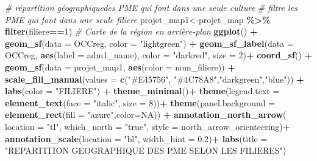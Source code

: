 \documentclass[
]{article}
\newenvironment{Shaded}{\begin{snugshade}}{\end{snugshade}}
\newcommand{\AttributeTok}[1]{\textcolor[rgb]{0.13,0.29,0.53}{#1}}
\newcommand{\CommentTok}[1]{\textcolor[rgb]{0.56,0.35,0.01}{\textit{#1}}}
\newcommand{\ConstantTok}[1]{\textcolor[rgb]{0.56,0.35,0.01}{#1}}
\newcommand{\DecValTok}[1]{\textcolor[rgb]{0.00,0.00,0.81}{#1}}
\newcommand{\FloatTok}[1]{\textcolor[rgb]{0.00,0.00,0.81}{#1}}
\newcommand{\FunctionTok}[1]{\textcolor[rgb]{0.13,0.29,0.53}{\textbf{#1}}}
\newcommand{\NormalTok}[1]{#1}
\newcommand{\OtherTok}[1]{\textcolor[rgb]{0.56,0.35,0.01}{#1}}
\newcommand{\SpecialCharTok}[1]{\textcolor[rgb]{0.81,0.36,0.00}{\textbf{#1}}}
\newcommand{\StringTok}[1]{\textcolor[rgb]{0.31,0.60,0.02}{#1}}
\begin{document}
\begin{Shaded}
\begin{Highlighting}[]
\CommentTok{\# répartition géographiquedes PME qui font dans une seule culture}
\CommentTok{\# filtre les PME qui font dans une seule filiere}
\NormalTok{projet\_map1}\OtherTok{\textless{}{-}}\NormalTok{projet\_map }\SpecialCharTok{\%\textgreater{}\%} \FunctionTok{filter}\NormalTok{(filiere}\SpecialCharTok{==}\DecValTok{1}\NormalTok{) }
 \CommentTok{\# Carte de la région en arrière{-}plan}
\FunctionTok{ggplot}\NormalTok{() }\SpecialCharTok{+}
  \FunctionTok{geom\_sf}\NormalTok{(}\AttributeTok{data =}\NormalTok{ OCCreg, }\AttributeTok{color =} \StringTok{"lightgreen"}\NormalTok{) }\SpecialCharTok{+} 
  \FunctionTok{geom\_sf\_label}\NormalTok{(}\AttributeTok{data =}\NormalTok{ OCCreg, }
                \FunctionTok{aes}\NormalTok{(}\AttributeTok{label =}\NormalTok{ adm1\_name), }\AttributeTok{color =} \StringTok{"darkred"}\NormalTok{, }\AttributeTok{size =} \DecValTok{2}\NormalTok{)}\SpecialCharTok{+}
  \FunctionTok{coord\_sf}\NormalTok{() }\SpecialCharTok{+}
  \FunctionTok{geom\_sf}\NormalTok{(}\AttributeTok{data =}\NormalTok{ projet\_map1, }\FunctionTok{aes}\NormalTok{(}\AttributeTok{color =}\NormalTok{ nom\_filiere)) }\SpecialCharTok{+}
  \FunctionTok{scale\_fill\_manual}\NormalTok{(}\AttributeTok{values =} \FunctionTok{c}\NormalTok{(}\StringTok{"\#E45756"}\NormalTok{, }\StringTok{"\#4C78A8"}\NormalTok{,}\StringTok{"darkgreen"}\NormalTok{,}\StringTok{"blue"}\NormalTok{)) }\SpecialCharTok{+} 
  \FunctionTok{labs}\NormalTok{(}\AttributeTok{color =} \StringTok{"FILIERE"}\NormalTok{) }\SpecialCharTok{+}
  \FunctionTok{theme\_minimal}\NormalTok{()}\SpecialCharTok{+}
  \FunctionTok{theme}\NormalTok{(}\AttributeTok{legend.text =} \FunctionTok{element\_text}\NormalTok{(}\AttributeTok{face =} \StringTok{"italic"}\NormalTok{, }\AttributeTok{size =} \DecValTok{8}\NormalTok{))}\SpecialCharTok{+}
  \FunctionTok{theme}\NormalTok{(}\AttributeTok{panel.background =} \FunctionTok{element\_rect}\NormalTok{(}\AttributeTok{fill =} \StringTok{"azure"}\NormalTok{,}\AttributeTok{color=}\ConstantTok{NA}\NormalTok{)) }\SpecialCharTok{+}
  \FunctionTok{annotation\_north\_arrow}\NormalTok{(}
    \AttributeTok{location =} \StringTok{"tl"}\NormalTok{, }\AttributeTok{which\_north =} \StringTok{"true"}\NormalTok{, }\AttributeTok{style =}\NormalTok{ north\_arrow\_orienteering)}\SpecialCharTok{+}
  \FunctionTok{annotation\_scale}\NormalTok{(}\AttributeTok{location =} \StringTok{"bl"}\NormalTok{, }\AttributeTok{width\_hint =} \FloatTok{0.2}\NormalTok{)}\SpecialCharTok{+}
  \FunctionTok{labs}\NormalTok{(}\AttributeTok{title =} \StringTok{"REPARTITION GEOGRAPHIQUE DES PME SELON LES FILIERES"}\NormalTok{)}
\end{Highlighting}
\end{Shaded}
\end{document}
